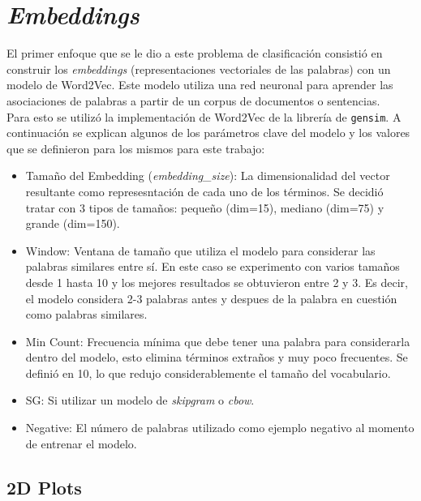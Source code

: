\section{\textit{Embeddings}}

El primer enfoque que se le dio a este problema de clasificación consistió en construir los \textit{embeddings} (representaciones vectoriales de las palabras) con un modelo de Word2Vec. Este modelo utiliza una red neuronal para aprender las asociaciones de palabras a partir de un corpus de documentos o sentencias. \\

Para esto se utilizó la implementación de Word2Vec de la librería de \texttt{gensim}. A continuación se explican algunos de los parámetros clave del modelo y los valores que se definieron para los mismos para este trabajo:

\begin{itemize}
    \item Tamaño del Embedding (\textit{embedding\_size}): La dimensionalidad del vector resultante como represesntación de cada uno de los términos. Se decidió tratar con 3 tipos de tamaños: pequeño (dim=15), mediano (dim=75) y grande (dim=150).
    
    \item Window: Ventana de tamaño que utiliza el modelo para considerar las palabras similares entre sí. En este caso se experimento con varios tamaños desde 1 hasta 10 y los mejores resultados se obtuvieron entre 2 y 3. Es decir, el modelo considera 2-3 palabras antes y despues de la palabra en cuestión como palabras similares.
    
    \item Min Count: Frecuencia mínima que debe tener una palabra para considerarla dentro del modelo, esto elimina términos extraños y muy poco frecuentes. Se definió en 10, lo que redujo considerablemente el tamaño del vocabulario.
    
    \item SG: Si utilizar un modelo de \textit{skipgram} o \textit{cbow}. 
    
    \item Negative: El número de palabras utilizado como ejemplo negativo al momento de entrenar el modelo. 
\end{itemize}

\subsection{2D Plots}


